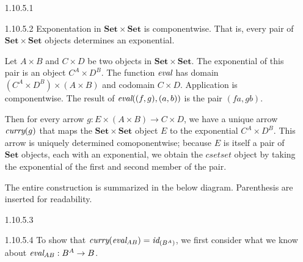 \documentclass{article}
\newcommand{\curry}[1]{\emph{curry}(#1)}
\newcommand{\eval}{\emph{eval}}
\newcommand{\id}{\emph{id}}
\newcommand{\cset}{\mathbf{Set}}
\newcommand{\csetset}{\cset \times \cset}
\begin{document}
\begin{enumerate}
\item [1.10.5.1]
\item [1.10.5.2]
  Exponentation in $\csetset$ is componentwise.
  That is, every pair of $\csetset$ objects determines an exponential.
  
  Let $A \times B$ and $C \times D$ be two objects in $\csetset$.
  The exponential of this pair is an object $C^A \times D^B$.
  The function $\eval$  has domain $(C^A \times D^B) \times (A \times B)$ and codomain $C \times D$.
  Application is componentwise.
  The result of $\eval((f, g), (a,b))$ is the pair $(f a, g b)$.

  Then for every arrow $g : E \times (A \times B) \rightarrow C \times D$, we have a unique arrow $\curry{g}$ that maps the $\csetset$ object $E$ to the exponential $C^A \times D^B$.
  This arrow is uniquely determined comoponentwise; because $E$ is itself a pair of $\cset$ objects, each with an exponential, we obtain the $csetset$ object by taking the exponential of the first and second member of the pair.
  
  The entire construction is summarized in the below diagram.
  Parenthesis are inserted for readability.
  \begin{center}
  \end{center}

\item [1.10.5.3]

\newpage
\item [1.10.5.4]
  To show that $\curry{\eval_{AB}} = \id_{(B^A)}$, we first consider what we know about $\eval_{AB} : B^A \rightarrow B$.
  \begin{center}
  \end{center}
  

\end{enumerate}
\end{document}

